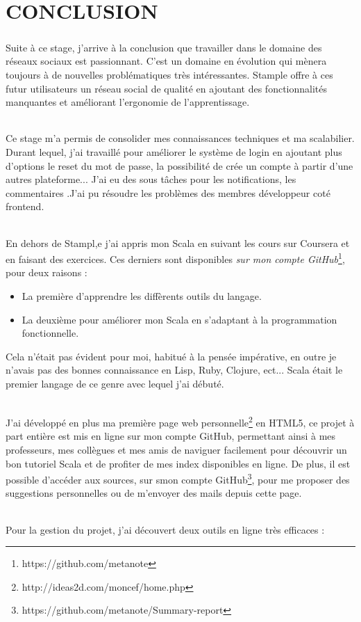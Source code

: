 \chapter{CONCLUSION}
\paragraph{}
Suite à ce stage, j’arrive à la conclusion que travailler dans le domaine des réseaux sociaux est passionnant. C’est un domaine en évolution qui mènera toujours à de nouvelles problématiques très intéressantes.
Stample offre à ces futur utilisateurs un réseau social de qualité en ajoutant des fonctionnalités manquantes et améliorant l'ergonomie de l'apprentissage.
\subparagraph{}
Ce stage m'a permis de consolider mes connaissances techniques et ma scalabilier.
Durant lequel, j'ai travaillé pour améliorer le système de login en ajoutant plus d'options le reset du mot de passe, la possibilité de crée un compte à partir d'une autres plateforme...
J'ai eu des sous tâches pour les notifications, les commentaires .J'ai pu résoudre les problèmes des membres développeur coté frontend.
\subparagraph{}
En dehors de Stampl,e j'ai appris mon Scala en suivant les cours sur Coursera et en faisant des exercices. Ces derniers sont disponibles \textit{sur mon compte GitHub}\footnote{https://github.com/metanote}, pour deux raisons :
\begin{itemize}
\item La première d'apprendre les diffèrents outils du langage.
\item La deuxième pour améliorer mon Scala en s'adaptant à la programmation fonctionnelle.
\end{itemize}
Cela n'était pas évident pour moi, habitué à la pensée impérative, en outre je n'avais pas des bonnes connaissance en Lisp, Ruby, Clojure, ect... Scala était le premier langage de ce genre avec lequel j'ai débuté.
\subparagraph{}
J'ai développé en plus ma première page web personnelle\footnote{http://ideas2d.com/moncef/home.php} en HTML5, ce projet à part entière est mis en ligne sur mon compte GitHub, permettant ainsi à mes professeurs, mes collègues et mes amis de naviguer facilement pour découvrir un bon tutoriel Scala et de profiter de mes index disponibles en ligne. De plus, il est possible d’accéder aux sources, sur smon compte GitHub\footnote{https://github.com/metanote/Summary-report}, pour me proposer des suggestions personnelles ou de m'envoyer des mails depuis cette page.
\subparagraph{}
Pour la gestion du projet, j'ai découvert deux outils en ligne très efficaces :\newline
